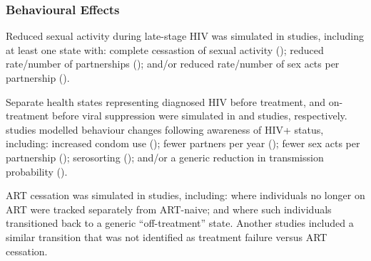 \subsubsection{Behavioural Effects}
\label{sss:res:beh}
Reduced sexual activity during late-stage HIV was simulated in  studies,
including at least one state with:
complete cessastion of sexual activity ();
reduced rate/number of partnerships (); and/or
reduced rate/number of sex acts per partnership ().
\par
Separate health states representing diagnosed HIV before treatment,
and on-treatment before viral suppression were simulated in
 and  studies, respectively.
 studies modelled behaviour changes following awareness of HIV+ status, including:
increased condom use ();
fewer partners per year ();
fewer sex acts per partnership ();
serosorting (); and/or
a generic reduction in transmission probability ().
\par
ART cessation was simulated in  studies, including:
 where individuals no longer on ART
were tracked separately from ART-naive; and
 where such individuals
transitioned back to a generic ``off-treatment'' state.
Another  studies included a similar transition
that was not identified as treatment failure versus ART cessation.
